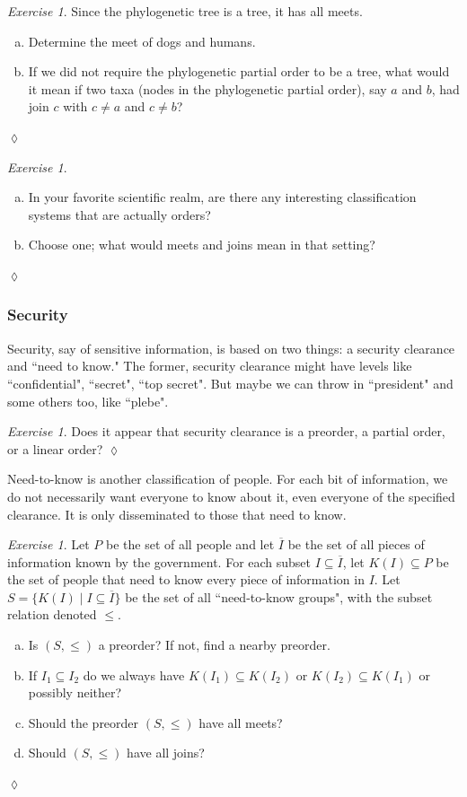 \documentclass{book}
\def\ss{\subseteq}
\def\|{{\;|\;}}
\def\ol{\overline}
\theoremstyle{remark}
\newtheorem{exc}[subsubsection]{Exercise}
\newenvironment{exercise}{\begin{exc}}{\hspace*{\fill}$\lozenge$\end{exc}}
\theoremstyle{definition}
\def\sexc{\begin{enumerate}[a.)]\setlength{\itemsep}{.1cm}\setlength{\parskip}{.1cm}\item}
\def\next{\item}
\def\endsexc{\end{enumerate}}
\begin{document}
\begin{exercise}
Since the phylogenetic tree is a tree, it has all meets.
\sexc Determine the meet of dogs and humans. 
\next If we did not require the phylogenetic partial order to be a tree, what would it mean if two taxa (nodes in the phylogenetic partial order), say $a$ and $b$, had join $c$ with $c\neq a$ and $c\neq b$?
\endsexc
\end{exercise}

\begin{exercise}~
\sexc In your favorite scientific realm, are there any interesting classification systems that are actually orders? 
\next Choose one; what would meets and joins mean in that setting?
\endsexc
\end{exercise}


\subsubsection{Security}

Security, say of sensitive information, is based on two things: a security clearance and ``need to know." The former, security clearance might have levels like ``confidential", ``secret", ``top secret". But maybe we can throw in ``president" and some others too, like ``plebe". 

\begin{exercise}
Does it appear that security clearance is a preorder, a partial order, or a linear order?
\end{exercise}

Need-to-know is another classification of people. For each bit of information, we do not necessarily want everyone to know about it, even everyone of the specified clearance. It is only disseminated to those that need to know. 

\begin{exercise}
Let $P$ be the set of all people and let $\ol{I}$ be the set of all pieces of information known by the government. For each subset $I\ss\ol{I}$, let $K(I)\ss P$ be the set of people that need to know every piece of information in $I$. Let $S=\{K(I)\|I\ss\ol{I}\}$ be the set of all ``need-to-know groups", with the subset relation denoted $\leq$. 

\sexc Is $(S,\leq)$ a preorder? If not, find a nearby preorder. 
\next If $I_1\ss I_2$ do we always have $K(I_1)\ss K(I_2)$ or $K(I_2)\ss K(I_1)$ or possibly neither? 
\next Should the preorder $(S,\leq)$ have all meets? 
\next Should $(S,\leq)$ have all joins?
\endsexc
\end{exercise}
\end{document}
